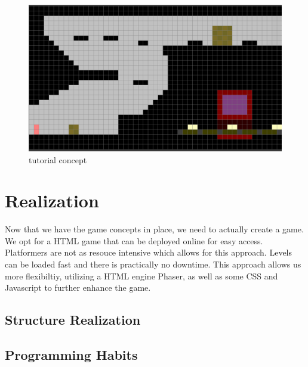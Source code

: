 \documentclass[a4paper,twoside,12pt]{article}
\begin{document}
\begin{figure}[h]
\includegraphics[scale=0.5]{level.png}
\caption{tutorial concept}
\end{figure}

\section{Realization}
Now that we have the game concepts in place, we need to actually create a game.
We opt for a HTML game that can be deployed online for easy access. Platformers are not as resouce intensive which allows for this approach. Levels can be loaded fast and there is practically no downtime. This approach allows us more flexibiltiy, utilizing a HTML engine Phaser, as well as some CSS and Javascript to further enhance the game.
\subsection{Structure Realization}


\subsection{Programming Habits}
\end{document}

